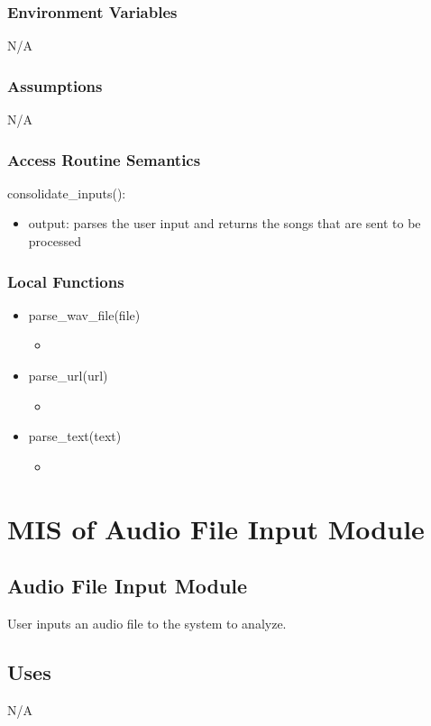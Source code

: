 \documentclass[12pt, titlepage]{article}
\begin{document}
\subsubsection{Environment Variables}
N/A

\subsubsection{Assumptions}
N/A

\subsubsection{Access Routine Semantics}

\noindent consolidate\_inputs():
\begin{itemize}
  \item output: parses the user input and returns the songs that are sent to be processed
\end{itemize}
\subsubsection{Local Functions}
\begin{itemize}
  \item parse\_wav\_file(file)
  \begin{itemize}
    \item
  \end{itemize}
  \item parse\_url(url)
  \begin{itemize}
    \item 
  \end{itemize}
  \item parse\_text(text)
  \begin{itemize}
    \item 
  \end{itemize}
\end{itemize}

\section{MIS of Audio File Input Module} 

\subsection{Audio File Input Module}
User inputs an audio file to the system to analyze. 

\subsection{Uses}
N/A
\end{document}
